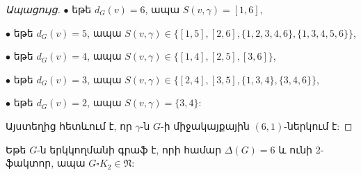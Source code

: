 \begin{hide}
\begin{proof}[Ապացույց]
$\bullet$ եթե $d_{G}(v)=6$, ապա $S(v,\gamma)=[1,6]$,

$\bullet$ եթե $d_{G}(v)=5$, ապա
$S(v,\gamma)\in \{[1,5],[2,6],\{1,2,3,4,6\},\{1,3,4,5,6\}\}$,

$\bullet$ եթե $d_{G}(v)=4$, ապա $S(v,\gamma)\in
\{[1,4],[2,5],[3,6]\}$,

$\bullet$ եթե $d_{G}(v)=3$, ապա
$S(v,\gamma)\in \{[2,4],[3,5],\{1,3,4\},\{3,4,6\}\}$,

$\bullet$ եթե $d_{G}(v)=2$, ապա $S(v,\gamma)=\{3,4\}$:

Այստեղից հետևում է, որ $\gamma$-ն $G$-ի միջակայքային $(6,1)$-ներկում է:
\end{proof}

\begin{corollary}
\label{c2_bipartite_Delta6_2factor} Եթե $G$-ն երկկողմանի գրաֆ է, որի համար $\Delta(G)=6$ և ունի 2-ֆակտոր, ապա $G \square K_2 \in \mathfrak{N}$:
\end{corollary}
\end{hide}
